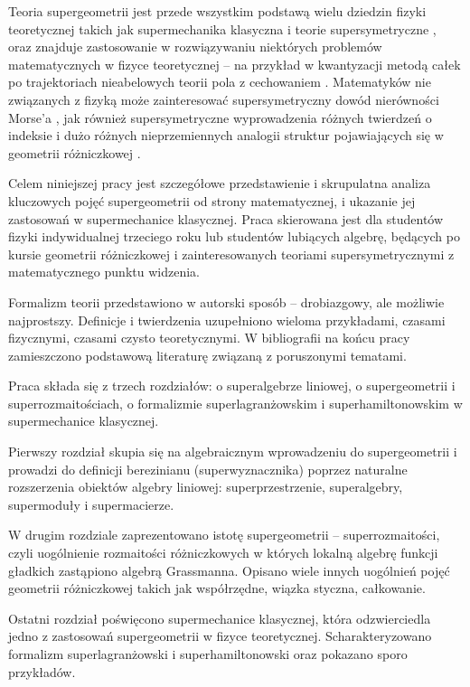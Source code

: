 \documentclass[11pt,a4paper]{report}
\theoremstyle{definition}
\begin{document}
Teoria supergeometrii jest przede wszystkim podstawą wielu dziedzin fizyki teoretycznej takich jak supermechanika klasyczna \cite{carinena} i teorie supersymetryczne \cite{carmeli}, oraz znajduje zastosowanie w rozwiązywaniu niektórych problemów matematycznych w fizyce teoretycznej -- na przykład w kwantyzacji metodą całek po trajektoriach nieabelowych teorii pola z cechowaniem \cite{ryder}. Matematyków nie związanych z fizyką może zainteresować supersymetryczny dowód nierówności Morse'a \cite{witten}, jak również supersymetryczne wyprowadzenia różnych twierdzeń o indeksie \cite{alvarez, manes} i dużo różnych nieprzemiennych analogii struktur pojawiających się w geometrii różniczkowej \cite{cattaneo}.

Celem niniejszej pracy jest szczegółowe przedstawienie i skrupulatna analiza kluczowych pojęć supergeometrii od strony matematycznej, i ukazanie jej zastosowań w supermechanice klasycznej. Praca skierowana jest dla studentów fizyki indywidualnej trzeciego roku lub studentów lubiących algebrę, będących po kursie geometrii różniczkowej i zainteresowanych teoriami supersymetrycznymi z matematycznego punktu widzenia.

Formalizm teorii przedstawiono w autorski sposób -- drobiazgowy, ale możliwie najprostszy. Definicje i twierdzenia uzupełniono wieloma przykładami, czasami fizycznymi, czasami czysto teoretycznymi. W bibliografii na końcu pracy zamieszczono podstawową literaturę związaną z poruszonymi tematami.

Praca składa się z trzech rozdziałów: o superalgebrze liniowej, o supergeometrii i superrozmaitościach, o formalizmie superlagranżowskim i superhamiltonowskim w supermechanice klasycznej.

Pierwszy rozdział skupia się na algebraicznym wprowadzeniu do supergeometrii i prowadzi do definicji berezinianu (superwyznacznika) poprzez naturalne rozszerzenia obiektów algebry liniowej: superprzestrzenie, superalgebry, supermoduły i supermacierze.

W drugim rozdziale zaprezentowano istotę supergeometrii -- superrozmaitości, czyli uogólnienie rozmaitości różniczkowych w których lokalną algebrę funkcji gładkich zastąpiono algebrą Grassmanna. Opisano wiele innych uogólnień pojęć geometrii różniczkowej takich jak współrzędne, wiązka styczna, całkowanie.

Ostatni rozdział poświęcono supermechanice klasycznej, która odzwierciedla jedno z zastosowań supergeometrii w fizyce teoretycznej. Scharakteryzowano formalizm superlagranżowski i superhamiltonowski oraz pokazano sporo przykładów.
\end{document}
